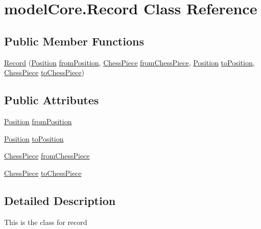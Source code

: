 \hypertarget{classmodel_core_1_1_record}{\section{model\+Core.\+Record Class Reference}
\label{classmodel_core_1_1_record}
}
\subsection*{Public Member Functions}
\begin{DoxyCompactItemize}
\item 
\hyperlink{classmodel_core_1_1_record_a8ea296d191e5510b45eece7db72478fd}{Record} (\hyperlink{classmodel_core_1_1_position}{Position} \hyperlink{classmodel_core_1_1_record_ae7cca522f71f0fb7b5e25b9c3fe00e46}{from\+Position}, \hyperlink{classmodel_chess_pieces_1_1_chess_piece}{Chess\+Piece} \hyperlink{classmodel_core_1_1_record_a38bcd5a97552a51ac6c3e657a2d59c77}{from\+Chess\+Piece}, \hyperlink{classmodel_core_1_1_position}{Position} \hyperlink{classmodel_core_1_1_record_a9beacb5341758e83ebe459f71b6e2511}{to\+Position}, \hyperlink{classmodel_chess_pieces_1_1_chess_piece}{Chess\+Piece} \hyperlink{classmodel_core_1_1_record_abdc3856c453073728a148a4aec3a91e9}{to\+Chess\+Piece})
\end{DoxyCompactItemize}
\subsection*{Public Attributes}
\begin{DoxyCompactItemize}
\item 
\hyperlink{classmodel_core_1_1_position}{Position} \hyperlink{classmodel_core_1_1_record_ae7cca522f71f0fb7b5e25b9c3fe00e46}{from\+Position}
\item 
\hyperlink{classmodel_core_1_1_position}{Position} \hyperlink{classmodel_core_1_1_record_a9beacb5341758e83ebe459f71b6e2511}{to\+Position}
\item 
\hyperlink{classmodel_chess_pieces_1_1_chess_piece}{Chess\+Piece} \hyperlink{classmodel_core_1_1_record_a38bcd5a97552a51ac6c3e657a2d59c77}{from\+Chess\+Piece}
\item 
\hyperlink{classmodel_chess_pieces_1_1_chess_piece}{Chess\+Piece} \hyperlink{classmodel_core_1_1_record_abdc3856c453073728a148a4aec3a91e9}{to\+Chess\+Piece}
\end{DoxyCompactItemize}


\subsection{Detailed Description}
This is the class for record

